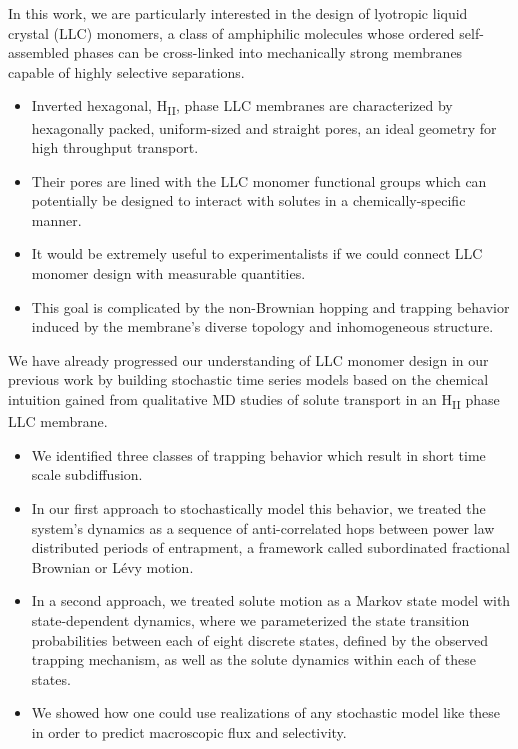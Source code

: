\documentclass[journal=jpcbfk,manuscript=article]{achemso}
\begin{document}
  In this work, we are particularly interested in the design of lyotropic liquid crystal (LLC)
  monomers, a class of amphiphilic molecules whose ordered self-assembled phases can be 
  cross-linked into mechanically strong membranes capable of highly selective separations.
  \begin{itemize}
  	\item Inverted hexagonal, H\textsubscript{II}, phase LLC membranes are characterized
  	by hexagonally packed, uniform-sized and straight pores, an ideal geometry for high 
  	throughput transport.
	\item Their pores are lined with the LLC monomer functional groups which can
	potentially be designed to interact with solutes in a chemically-specific manner.
	\item It would be extremely useful to experimentalists if we could connect LLC monomer
	design with measurable quantities.
	\item This goal is complicated by the non-Brownian hopping and trapping behavior
	induced by the membrane's diverse topology and inhomogeneous structure.~\cite{coscia_understanding_2019,coscia_chemically_2019}
  \end{itemize}
  
  We have already progressed our understanding of LLC monomer design in our previous work
  by building stochastic time series models based on the chemical intuition gained
  from qualitative MD studies of solute transport in an H\textsubscript{II} phase LLC
  membrane.~\cite{coscia_chemically_2019,coscia_capturing_2020}
  \begin{itemize}
    \item We identified three classes of trapping behavior which result in short time scale
    subdiffusion.
    \item In our first approach to stochastically model this behavior, we treated the
    system's dynamics as a sequence of anti-correlated hops between power law distributed
    periods of entrapment, a framework called subordinated fractional Brownian or L\'evy
    motion.
    \item In a second approach, we treated solute motion as a Markov state model with 
    state-dependent dynamics, where we parameterized the state transition probabilities 
    between each of eight discrete states, defined by the observed trapping mechanism, 
    as well as the solute dynamics within each of these states. 
    \item We showed how one could use realizations of any stochastic model like these in
    order to predict macroscopic flux and selectivity. 
  \end{itemize}
  
\end{document}
